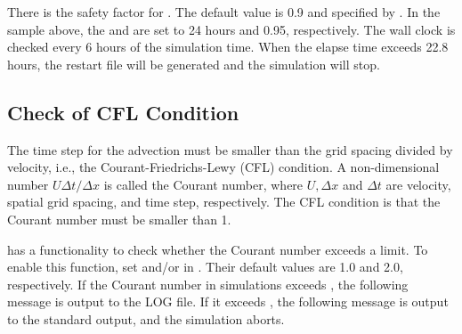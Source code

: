 There is the safety factor for . The default value is 0.9 and specified by . In the sample above, the  and  are set to 24 hours and 0.95, respectively. The wall clock is checked every 6 hours of the simulation time. When the elapse time exceeds 22.8 hours, the restart file will be generated and the simulation will stop.



\subsection{Check of CFL Condition} \label{subsec:cfl_check}

The time step for the advection  must be smaller than the grid spacing divided by velocity, i.e., the Courant-Friedrichs-Lewy (CFL) condition.
A non-dimensional number $U \Delta t/\Delta x$ is called the Courant number, where $U, \Delta x$ and $\Delta t$ are velocity, spatial grid spacing, and time step, respectively.
The CFL condition is that the Courant number must be smaller than 1.

\scalerm has a functionality to check whether the Courant number exceeds a limit.
To enable this function, set  and/or  in .
Their default values are 1.0 and 2.0, respectively.
If the Courant number in simulations exceeds , the following message is output to the LOG file.
If it exceeds , the following message is output to the standard output, and the simulation aborts.
